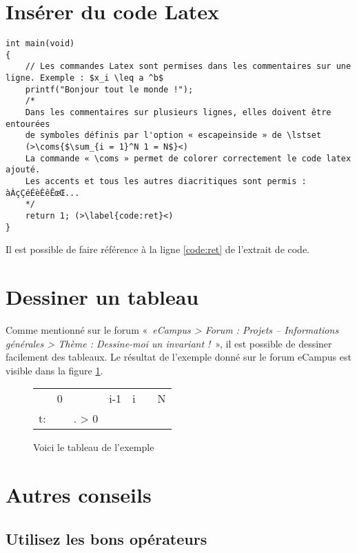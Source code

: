 \documentclass[a4paper, 11pt, oneside]{article}
\newcommand{\coms}[1]{\textcolor{MidnightBlue}{#1}}
\begin{document}
\newpage
\section{Insérer du code Latex}

\begin{lstlisting}[caption={Un programme tout simple}]
int main(void)
{
	// Les commandes Latex sont permises dans les commentaires sur une ligne. Exemple : $x_i \leq a ^b$
	printf("Bonjour tout le monde !");
	/*
	Dans les commentaires sur plusieurs lignes, elles doivent être entourées
	de symboles définis par l'option « escapeinside » de \lstset
	(>\coms{$\sum_{i = 1}^N 1 = N$}<)
	La commande « \coms » permet de colorer correctement le code latex ajouté.
	Les accents et tous les autres diacritiques sont permis : àÀçÇéÉèÈêÊœŒ...
	*/
	return 1; (>\label{code:ret}<)
}
\end{lstlisting}

Il est possible de faire référence à la ligne \ref{code:ret} de l'extrait de code.

\section{Dessiner un tableau}

Comme mentionné sur le forum «~\emph{eCampus > Forum : Projets -- Informations générales > Thème : Dessine-moi un invariant !}~», il est possible de dessiner facilement des tableaux. Le résultat de l'exemple donné sur le forum eCampus est visible dans la figure \ref{fig:exemple}.

\begin{figure}[!h]
\centering
\begin{tabular}{l|llr|ll|l}
 & 0 &  & \multicolumn{1}{r|}{i-1} & i &  & N \\ \cline{2-6}
t: & \cellcolor[HTML]{FFCC67} & \cellcolor[HTML]{FFCC67}. > 0 & \cellcolor[HTML]{FFCC67} &  &  &  \\ \cline{2-6}
\end{tabular}
\caption{Voici le tableau de l'exemple}
\label{fig:exemple}
\end{figure}

\section{Autres conseils}

\subsection{Utilisez les bons opérateurs}
\end{document}
